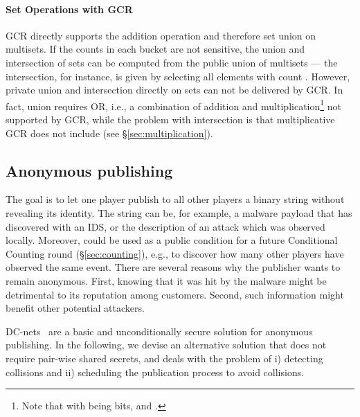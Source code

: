 \documentclass{sig-alternate}
\begin{document}
\paragraph{Set Operations with GCR}
GCR directly supports the addition operation and therefore set union on multisets. If the counts in each bucket are not sensitive, the union and intersection of sets can be computed from the public union of multisets --- the intersection, for instance, is given by selecting all elements with count . 
However, private union and intersection  directly on sets can not be delivered by GCR.
In fact, union requires OR, i.e., a combination of addition and multiplication\footnote{Note that with  being bits,  and .} not supported by GCR, while the problem with intersection is that  multiplicative GCR does not include  (see \S\ref{sec:multiplication}).  
 

\subsection{Anonymous publishing}\label{sec:publishing}

The goal is to let one player  publish to all other players a binary string  without revealing its identity. 
The string  can be, for example, a malware payload that  has discovered with an IDS, or the description of an attack which was observed locally.
Moreover,  could be used as a public condition for a future Conditional Counting round  (\S \ref{sec:counting}), e.g., to discover how many other players have observed the same event.
There are several reasons why the publisher wants to remain anonymous.
First, knowing that it was hit by the malware might be detrimental to its reputation among customers.
Second, such information might benefit other potential attackers.

DC-nets~\cite{chaum1988dining} are a basic and unconditionally secure solution for anonymous publishing. In the following, we devise an alternative solution that does not require pair-wise shared secrets, 
 and deals with the problem of i) detecting collisions and ii) scheduling the publication process to avoid collisions. 
\end{document}
